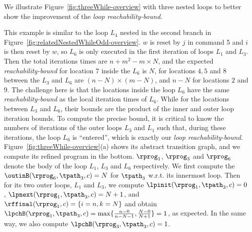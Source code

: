 We illustrate Figure~\ref{fig:threeWhile-overview} with three nested loops to better show the improvement of the \emph{loop reachability-bound}.

This example is similar to the loop $L_4$ nested in the second branch in Figure~\ref{fig:relatedNestedWhileOdd-overview}.
$w$ is reset by $j$ in command 5 and $i$ is then reset by $w$, so $L_6$ is only executed in the first iteration of loops $L_1$ and $L_3$.
Then the total iterations times are
$n + m^2 - m \times N$,
and the expected \emph{reachability-bound} for location $7$ inside the $L_6$ is $N$,
for locations $4, 5$ and $8$ between the $L_3$ and $L_6$ are $(n-N) \times (m - N)$,
and $n - N$ for locations $2$ and $9$.
The challenge here is that the locations inside the loop $L_6$ have the same
\emph{reachability-bound} as the local iteration times of $L_6$.
While for the locations between $L_3$ and $L_6$, their bounds are the product of the inner and outer loop iteration bounds.
To compute the precise bound, it is critical to know
the numbers of iterations of the outer loops $L_3$ and $L_1$ such that,
during these iterations, the loop $L_6$ is ``entered'', which is exactly our \emph{loop reachability-bound}.
Figure~\ref{fig:threeWhile-overview}(a) shows its abstract transition graph,
and we compute its refined program in the bottom. 
$\rprog_1$, $\rprog_3$ and $\rprog_6$ denote the body of the loop $L_1$, $L_3$ and $L_6$ respectively.
We first compute the $\outinB(\rprog_6, \tpath_3, c) = N $ for $\tpath_3$ w.r.t. its innermost loop.
Then for its two outer loops, $L_1$ and $L_3$,
we compute $\lpinit( \rprog_1, \tpath_3, c) = 0$,
$\lpnext( \rprog_1, \tpath_3, c) = N + 1 $, and
$\rffinal(\rprog_1, c) = \{ i = n, k = N \}$ and obtain
$\lpchB(\rprog_1, \tpath_3, c) = \max\{ \frac{n - 0}{n - N - 1}, \frac{N - 0}{N + 1}\} = 1$, as expected.
In the same way, we also compute $\lpchB(\rprog_3, \tpath_3, c) = 1$.

